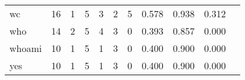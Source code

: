 \begin{longtable}{lp{1.2cm}p{1.2cm}p{1.2cm}p{1.2cm}p{1.2cm}p{1.2cm}p{1.2cm}p{1.2cm}p{1.2cm}p{1.2cm}}
wc        &                                    16 &                                                  1 &                                                  5 &                                                  3 &                                                  2 &                                                  5 &                                              0.578 &                                              0.938 &                                              0.312 \\
who       &                                    14 &                                                  2 &                                                  5 &                                                  4 &                                                  3 &                                                  0 &                                              0.393 &                                              0.857 &                                              0.000 \\
whoami    &                                    10 &                                                  1 &                                                  5 &                                                  1 &                                                  3 &                                                  0 &                                              0.400 &                                              0.900 &                                              0.000 \\
yes       &                                    10 &                                                  1 &                                                  5 &                                                  1 &                                                  3 &                                                  0 &                                              0.400 &                                              0.900 &                                              0.000 \\
\end{longtable}
